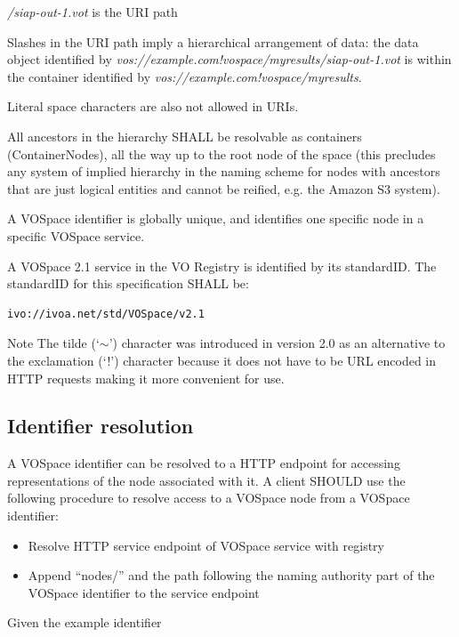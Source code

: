 \documentclass[11pt,a4paper]{ivoa}
\begin{document}
\emph{/siap-out-1.vot} is the URI path

Slashes in the URI path imply a hierarchical arrangement of data: the data object identified by \emph{vos://example.com!vospace/myresults/siap-out-1.vot} is within the container identified by \emph{vos://example.com!vospace/myresults}.

Literal space characters are also not allowed in URIs.

All ancestors in the hierarchy SHALL be resolvable as containers (ContainerNodes), all the way up to the root node of the space (this precludes any system of implied hierarchy in the naming scheme for nodes with ancestors that are just logical entities and cannot be reified, e.g. the Amazon S3 system).

A VOSpace identifier is globally unique, and identifies one specific node in a specific VOSpace service.

A VOSpace 2.1 service in the VO Registry is identified by its standardID.  The standardID for this specification SHALL be:
\begin{verbatim}
ivo://ivoa.net/std/VOSpace/v2.1
\end{verbatim}

\begin{admonition}{Note}
The tilde (`$\mathtt{\sim}$') character was introduced in version 2.0 as an alternative to the exclamation (`!') character because it does not have to be URL encoded in HTTP requests making it more convenient for use.
\end{admonition}

\subsection{Identifier resolution}
\label{subsec:identifier resolution}
A VOSpace identifier can be resolved to a HTTP endpoint for accessing representations of the node associated with it. A client SHOULD use the following procedure to resolve access to a VOSpace node from a VOSpace identifier:

\begin{itemize}
    \item Resolve HTTP service endpoint of VOSpace service with registry
    \item Append ``nodes/'' and the path following the naming authority part of the VOSpace identifier to the service endpoint
\end{itemize}

\noindent
Given the example identifier
\end{document}
